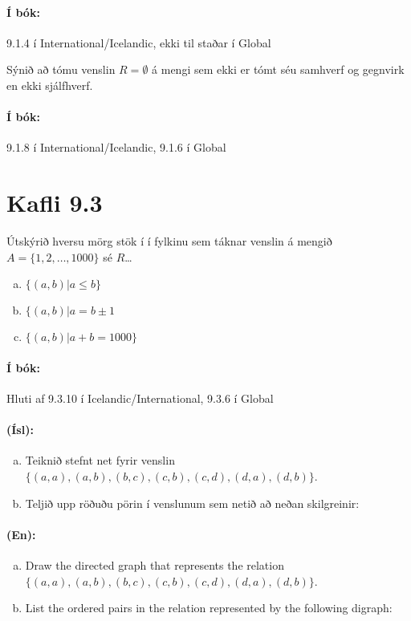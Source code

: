 \documentclass{article}
\begin{document}
\paragraph{Í bók:} 9.1.4 í International/Icelandic, ekki til staðar í Global

\question Sýnið að tómu venslin $R=\emptyset$ á mengi sem ekki er tómt séu samhverf og gegnvirk en ekki sjálfhverf.

\paragraph{Í bók:} 9.1.8 í International/Icelandic, 9.1.6 í Global

\section{Kafli 9.3}

\question Útskýrið hversu mörg stök í í fylkinu sem táknar venslin á mengið $A=\{1,2,\ldots,1000\}$ sé $R$\ldots

\begin{enumerate}[a)]
    \item $\{(a,b)| a \leq b\}$
    \item $\{(a,b)| a = b\pm 1$
    \item $\{(a,b)| a+b=1000\}$
\end{enumerate}

\paragraph{Í bók:} Hluti af 9.3.10 í Icelandic/International, 9.3.6 í Global

\question

\paragraph{(Ísl):}
\begin{enumerate}[a)]
    \item Teiknið stefnt net fyrir venslin $\{(a, a), (a, b), (b, c), (c, b), (c, d), (d, a), (d, b)\}$.
    \item Teljið upp röðuðu pörin í venslunum sem netið að neðan skilgreinir:
\end{enumerate}

\paragraph{(En):}
\begin{enumerate}[a)]
    \item  Draw the directed graph that represents the relation
    $\{(a, a), (a, b), (b, c), (c, b), (c, d), (d, a), (d, b)\}$.
    \item List the ordered pairs in the relation represented by the following digraph:
\end{enumerate}
\end{document}
